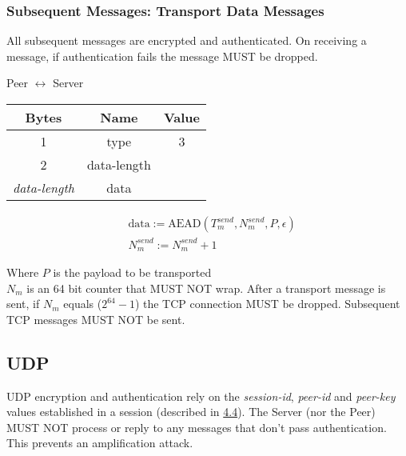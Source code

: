 \subsubsection{Subsequent Messages: Transport Data Messages}

All subsequent messages are encrypted and authenticated. On receiving a message, if authentication fails the message
MUST be dropped.

\begin{center}
    Peer $\leftrightarrow$ Server\\
    \begin{tabular}{|c|c|c|}
        \hline
        \textbf{Bytes}     & \textbf{Name} & \textbf{Value} \\
        \hline
        1                  & type          & 3              \\
        \hline
        2                  & data-length   &                \\
        \hline
        \emph{data-length} & data          &                \\
        \hline
    \end{tabular}
\end{center}

\begin{align*}
    & \text{data} := \text{AEAD}(T_{m}^{send}, N_{m}^{send}, P, \epsilon) \\
    & N_{m}^{send} := N_{m}^{send} + 1
\end{align*}

Where $P$ is the payload to be transported\\

$N_{m}$ is an 64 bit counter that MUST NOT wrap. After a transport message is sent, if $N_{m}$ equals
($2^{64}-1$) the TCP connection MUST be dropped. Subsequent TCP messages MUST NOT be sent. \\

\subsection{UDP}

UDP encryption and authentication rely on the \emph{session-id}, \emph{peer-id} and \emph{peer-key} values
established in a session
(described in \hyperlink{subsection.4.4}{4.4}). The Server (nor the Peer) MUST NOT
process or reply to any messages that don't pass authentication. This prevents an amplification attack.\\

